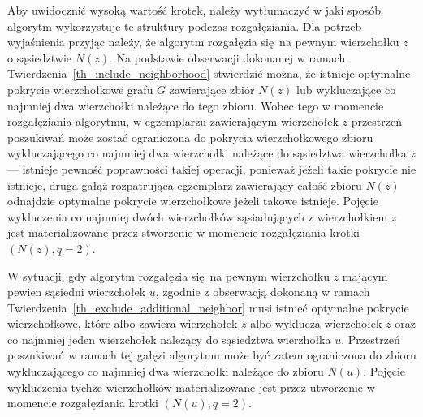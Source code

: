 \par{
  Aby uwidocznić wysoką wartość krotek, należy wytłumaczyć w jaki sposób algorytm wykorzystuje te struktury podczas rozgałęziania.
  Dla potrzeb wyjaśnienia przyjąc należy, że algorytm rozgałęzia się na pewnym wierzchołku $z$ o sąsiedztwie $N(z)$.
  Na podstawie obserwacji dokonanej w ramach Twierdzenia~\ref{th_include_neighborhood} stwierdzić można, że istnieje optymalne pokrycie wierzchołkowe grafu $G$ zawierające zbiór $N(z)$ lub wykluczające co najmniej dwa wierzchołki należące do tego zbioru.
  Wobec tego w momencie rozgałęziania algorytmu, w egzemplarzu zawierającym wierzchołek $z$ przestrzeń poszukiwań może zostać ograniczona do pokrycia wierzchołkowego zbioru wykluczającego co najmniej dwa wierzchołki należące do sąsiedztwa wierzchołka $z$ --- istnieje pewność poprawności takiej operacji, ponieważ jeżeli takie pokrycie nie istnieje, druga gałąź rozpatrująca egzemplarz zawierający całość zbioru $N(z)$ odnajdzie optymalne pokrycie wierzchołkowe jeżeli takowe istnieje.
  Pojęcie wykluczenia co najmniej dwóch wierzchołków sąsiadujących z wierzchołkiem $z$ jest materializowane przez stworzenie w momencie rozgałęziania krotki $(N(z), q=2)$.

  W sytuacji, gdy algorytm rozgałęzia się na pewnym wierzchołku $z$ mającym pewien sąsiedni wierzchołek $u$, zgodnie z obserwacją dokonaną w ramach Twierdzenia~\ref{th_exclude_additional_neighbor} musi istnieć optymalne pokrycie wierzchołkowe, które albo zawiera wierzchołek $z$ albo wyklucza wierzchołek $z$ oraz co najmniej jeden wierzchołek należący do sąsiedztwa wierzhołka $u$.
  Przestrzeń poszukiwań w ramach tej gałęzi algorytmu może być zatem ograniczona do zbioru wykluczającego co najmniej dwa wierzchołki należące do zbioru $N(u)$.
  Pojęcie wykluczenia tychże wierzchołków materializowane jest przez utworzenie w momencie rozgałęziania krotki $(N(u), q=2)$.
}
